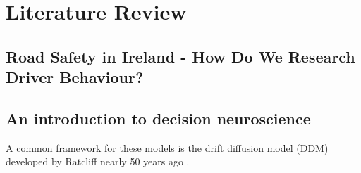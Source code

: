 \chapter{Literature Review}



\section{Road Safety in Ireland - How Do We Research Driver Behaviour?}



\section{An introduction to decision neuroscience}
A common framework for these models is the drift diffusion model (DDM) developed by Ratcliff nearly 50 years ago \cite{ratcliffTheoryMemoryRetrieval1978}.


